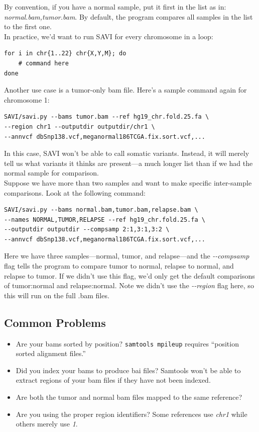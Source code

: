 \documentclass[letterpaper,14pt]{memoir}
\begin{document}
\noindent By convention, if you have a normal sample, put it first in the list as in: \textit{normal.bam,tumor.bam}.
By default, the program compares all samples in the list to the first one.\\

\noindent In practice, we'd want to run SAVI for every chromosome in a loop:

\begin{Verbatim}
for i in chr{1..22} chr{X,Y,M}; do
    # command here
done
\end{Verbatim}

\noindent Another use case is a tumor-only bam file. Here's a sample command again for chromosome 1:

\begin{Verbatim}
SAVI/savi.py --bams tumor.bam --ref hg19_chr.fold.25.fa \
--region chr1 --outputdir outputdir/chr1 \
--annvcf dbSnp138.vcf,meganormal186TCGA.fix.sort.vcf,...
\end{Verbatim}

\noindent In this case, SAVI won't be able to call somatic variants. Instead, it
will merely tell us what variants it thinks are present---a much longer list than
if we had the normal sample for comparison.\\

\noindent Suppose we have more than two samples and want to make specific inter-sample comparisons.
Look at the following command:

\begin{Verbatim}
SAVI/savi.py --bams normal.bam,tumor.bam,relapse.bam \
--names NORMAL,TUMOR,RELAPSE --ref hg19_chr.fold.25.fa \
--outputdir outputdir --compsamp 2:1,3:1,3:2 \
--annvcf dbSnp138.vcf,meganormal186TCGA.fix.sort.vcf,...
\end{Verbatim}

\noindent Here we have three samples---normal, tumor, and relapse---and the \textit{-{}-compsamp} flag tells the program to compare tumor to normal, relapse to normal, and relapse to tumor. If we didn't use this flag, we'd only get the default comparisons of tumor:normal and relapse:normal. Note we didn't use the \textit{-{}-region} flag here, so this will run on the full .bam files.

\subsection{Common Problems}\label{Common Problems}

\begin{itemize}
\tightlist
\item
  Are your bams sorted by position? \texttt{samtools mpileup} requires
  ``position sorted alignment files.''
\item
  Did you index your bams to produce bai files? Samtools won't be able
  to extract regions of your bam files if they have not been indexed.
\item
  Are both the tumor and normal bam files mapped to the same reference?
\item
  Are you using the proper region identifiers? Some references use
  \textit{chr1} while others merely use \textit{1}.
\end{itemize}
\end{document}
